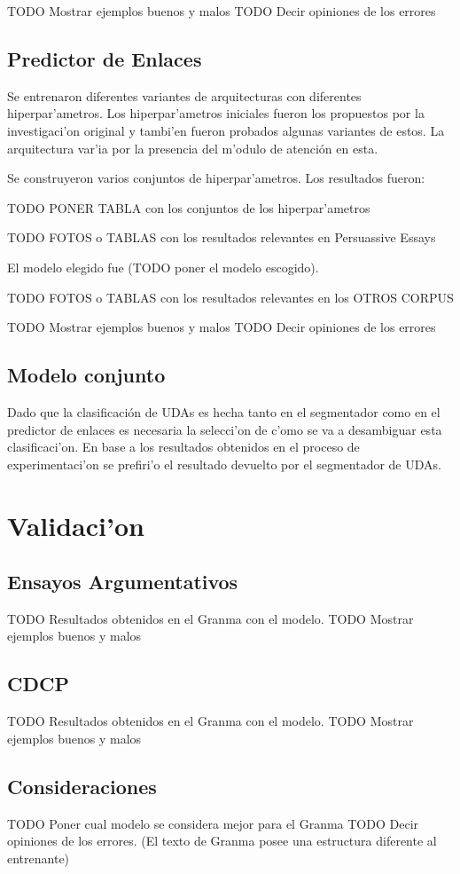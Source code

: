 TODO Mostrar ejemplos buenos y malos
TODO Decir opiniones de los errores

\subsection{Predictor de Enlaces}

Se entrenaron diferentes variantes de arquitecturas con diferentes hiperpar'ametros. Los hiperpar'ametros
iniciales fueron los propuestos por la investigaci'on original y tambi'en fueron probados algunas variantes 
de estos. La arquitectura var'ia por la presencia del m'odulo de atención en esta.

Se construyeron varios conjuntos de hiperpar'ametros. Los resultados fueron:

TODO PONER TABLA con los conjuntos de los hiperpar'ametros

TODO FOTOS o TABLAS con los resultados relevantes en Persuassive Essays 

El modelo elegido fue (TODO poner el modelo escogido).

TODO FOTOS o TABLAS con los resultados relevantes en los OTROS CORPUS

TODO Mostrar ejemplos buenos y malos
TODO Decir opiniones de los errores

\subsection{Modelo conjunto}

Dado que la clasificación de UDAs es hecha tanto en el segmentador como en el predictor de enlaces es necesaria 
la selecci'on de c'omo se va a desambiguar esta clasificaci'on. En base a los resultados obtenidos en el proceso
de experimentaci'on se prefiri'o el resultado devuelto por el segmentador de UDAs.

\section{Validaci'on}

\subsection{Ensayos Argumentativos}

TODO Resultados obtenidos en el Granma con el modelo.
TODO Mostrar ejemplos buenos y malos

\subsection{CDCP}

TODO Resultados obtenidos en el Granma con el modelo.
TODO Mostrar ejemplos buenos y malos

\subsection{Consideraciones}

TODO Poner cual modelo se considera mejor para el Granma 
TODO Decir opiniones de los errores. (El texto de Granma posee una estructura diferente al entrenante)
